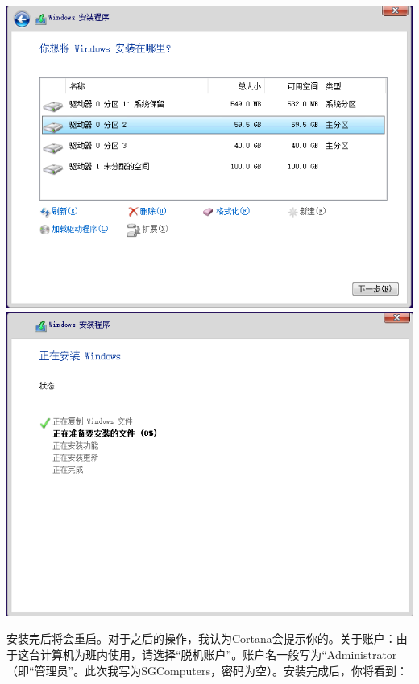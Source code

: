 \begin{center}
	\includegraphics[scale=0.45]{pic/win10setup6}	\includegraphics[scale=0.45]{pic/win10setup7}
\end{center} \par
安装完后将会重启。{\color{red}{注意，弹出光盘！}}对于之后的操作，我认为Cortana会提示你的。关于账户：由于这台计算机为班内使用，请选择“脱机账户”。账户名一般写为“Administrator（即“管理员”。此次我写为SGComputers，密码为空）。安装完成后，你将看到：

